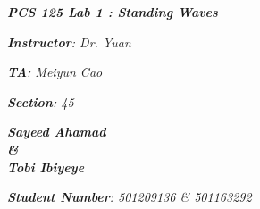 

\begin{titlepage}
    \begin{center}
        \vspace*{1cm}
            
        \date{}
            
        \huge
            
        \textit{\textbf{PCS 125 Lab 1 : Standing Waves}}
            
        \vspace{0.25cm}
            
            
            
		\vspace{0.25cm}
            
            
        \LARGE
            

		\textit{\textbf{Instructor}: Dr. Yuan}

		\textit{\textbf{TA}: Meiyun Cao}

		\textit{\textbf{Section}: 45}

		\vspace{2.5cm}

		\textit{\textbf{Sayeed Ahamad \\ \& \\ Tobi Ibiyeye}}
            
            
        \Large         

		\vspace{5cm}

		\vspace{0cm}            
            
		\Large		
		        
		
		\textit{\textbf{Student Number}: 501209136 \& 501163292}
            
        \vspace{2cm}
            
        \Large
         
		\vspace{0.25cm}                  
            
        \vspace{0.25cm}
           
            
    \end{center}
\end{titlepage}



